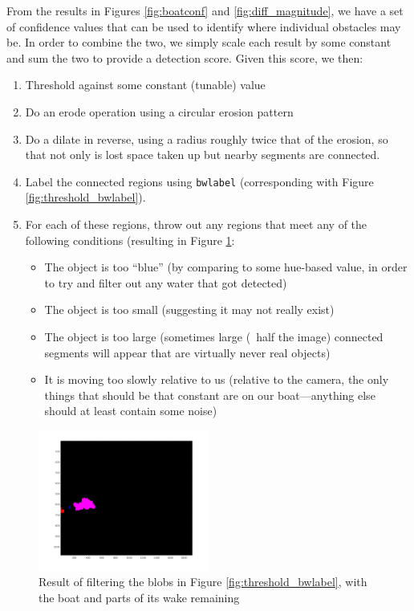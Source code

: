 \documentclass{article}
\begin{document}
From the results in Figures \ref{fig:boatconf} and
\ref{fig:diff_magnitude}, we have a set of confidence values that can be used to
identify where individual obstacles may be. In order to combine the two, we
simply scale each result by some constant and sum the two to provide a
detection score. Given this score, we then:
\begin{enumerate}
\item Threshold against some constant (tunable) value
\item Do an erode operation using a circular erosion pattern
\item Do a dilate in reverse, using a radius roughly twice that of the erosion,
      so that not only is lost space taken up but nearby segments are connected.
\item Label the connected regions using \texttt{bwlabel} (corresponding with
      Figure \ref{fig:threshold_bwlabel}).
\item For each of these regions, throw out any regions that meet any of the
      following conditions (resulting in Figure \ref{fig:filtered_labels}:
  \begin{itemize}
    \item The object is too ``blue'' (by comparing to some hue-based value,
          in order to try and filter out any water that got detected)
    \item The object is too small (suggesting it may not really exist)
    \item The object is too large (sometimes large (~half the image) connected
          segments will appear that are virtually never real objects)
    \item It is moving too slowly relative to us (relative to the camera,
          the only things that should be that constant are on our
          boat---anything else should at least contain some noise)
  \end{itemize}
\end{enumerate}

\begin{figure}
\centering
\includegraphics[width=0.5\textwidth]{filtered_labels}
\caption{Result of filtering the blobs in Figure \ref{fig:threshold_bwlabel},
         with the boat and parts of its wake remaining}
\label{fig:filtered_labels}
\end{figure}
\end{document}
